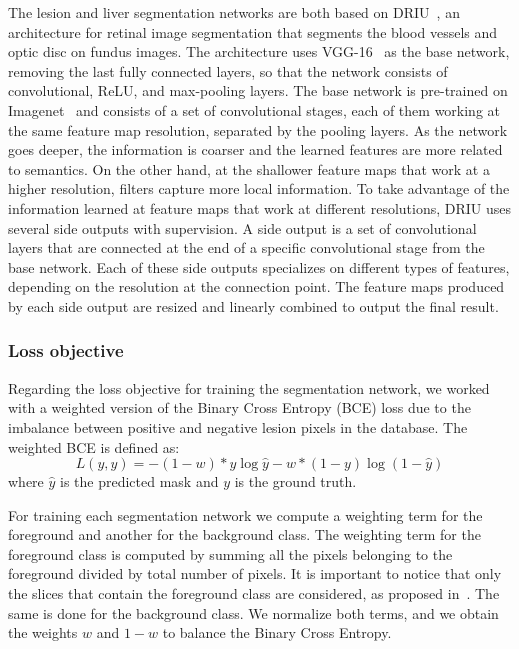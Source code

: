 \documentclass{article}
\begin{document}
The lesion and liver segmentation networks are both based on DRIU~\cite{maninis2016deep}, an architecture for retinal image segmentation that segments the blood vessels and optic disc on fundus images. The architecture uses VGG-16~\cite{simonyan2014very} as the base network, removing the last fully connected layers, so that the network consists of convolutional, ReLU, and max-pooling layers. The base network is pre-trained on Imagenet~\cite{ILSVRC15} and consists of a set of convolutional stages, each of them working at the same feature map resolution, separated by the pooling layers. As the network goes deeper, the information is coarser and  the learned features are more related to semantics. On the other hand, at the shallower feature maps that work at a higher resolution, filters capture more local information. To take advantage of the information learned at feature maps that work at different resolutions, DRIU uses several side outputs with supervision. A side output is a set of convolutional layers that are connected at the end of a specific convolutional stage from the base network. Each of these side outputs specializes on different types of features, depending on the resolution at the connection point. The feature maps produced by each side output are resized and linearly combined to output the final result. 

\subsubsection{Loss objective}

Regarding the loss objective for training the segmentation network, we worked with a weighted version of the Binary Cross Entropy (BCE) loss due to the imbalance between positive and negative lesion pixels in the database. The weighted BCE is defined as:
\[\mathit{L}(y,\hat{y}) = - (1-w)*y\log \hat{y} - w*(1-y)\log (1-\hat{y})\]
where \(\hat{y}\) is the predicted mask and \(y\) is the ground truth.

For training each segmentation network we compute a weighting term for the foreground and another for the background class. The weighting term for the foreground class is computed by summing all the pixels belonging to the foreground divided by total number of pixels. It is important to notice that only the slices that contain the foreground class are considered, as proposed in~\cite{eigen2015predicting}. The same is done for the background class. We normalize both terms, and we obtain the weights \(w\) and \(1-w\) to balance the Binary Cross Entropy.
\end{document}
